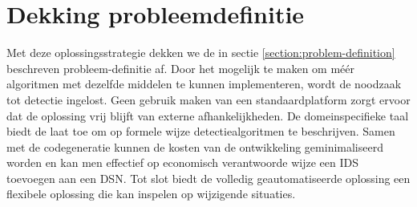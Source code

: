 \vspace{-3mm}

\section{Dekking probleemdefinitie}
\label{section:problem-coverage}

Met deze oplossingsstrategie dekken we de in sectie
\ref{section:problem-definition} beschreven probleem-definitie af. Door het
mogelijk te maken om m\'e\'er algoritmen met dezelfde middelen te kunnen
implementeren, wordt de noodzaak tot detectie ingelost. Geen gebruik maken van
een standaardplatform zorgt ervoor dat de oplossing vrij blijft van externe
afhankelijkheden. De domeinspecifieke taal biedt de laat toe om op formele
wijze detectiealgoritmen te beschrijven. Samen met de codegeneratie kunnen de
kosten van de ontwikkeling geminimaliseerd worden en kan men effectief op
economisch verantwoorde wijze een IDS toevoegen aan een DSN. Tot slot biedt de
volledig geautomatiseerde oplossing een flexibele oplossing die kan inspelen op
wijzigende situaties.
